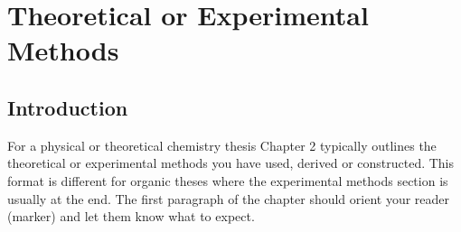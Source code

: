 \chapter{Theoretical or Experimental Methods}\label{Chapter:Two}
\section{Introduction}
For a physical or theoretical chemistry thesis Chapter 2 typically outlines 
the theoretical or experimental methods you have used, derived or constructed. 
This format is different for organic theses where the experimental methods 
section is usually at the end. The first paragraph of the chapter should 
orient your reader (marker) and let them know what to expect.

